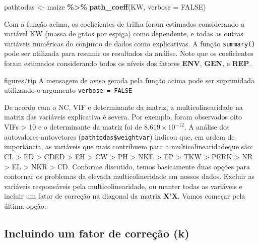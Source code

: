 \documentclass[
]{book}
\newenvironment{Shaded}{\begin{snugshade}}{\end{snugshade}}
\newcommand{\DataTypeTok}[1]{\textcolor[rgb]{0.13,0.29,0.53}{#1}}
\newcommand{\KeywordTok}[1]{\textcolor[rgb]{0.13,0.29,0.53}{\textbf{#1}}}
\newcommand{\NormalTok}[1]{#1}
\newcommand{\OperatorTok}[1]{\textcolor[rgb]{0.81,0.36,0.00}{\textbf{#1}}}
\newcommand{\OtherTok}[1]{\textcolor[rgb]{0.56,0.35,0.01}{#1}}
\newcommand{\StringTok}[1]{\textcolor[rgb]{0.31,0.60,0.02}{#1}}
\numberwithin{equation}{section}
\newcommand{\indt}[1]{\index{#1|ST}}
\newenvironment{dica}
  {\begin{customBlockImage}[colframe=customBlue, title=Dica]{figures/tip}}
  {\end{customBlockImage}}
\begin{document}
\begin{Shaded}
\begin{Highlighting}[]
\NormalTok{pathtodas \textless{}{-}}\StringTok{ }
\StringTok{  }\NormalTok{maize }\OperatorTok{\%\textgreater{}\%}
\StringTok{  }\KeywordTok{path\_coeff}\NormalTok{(KW, }\DataTypeTok{verbose =} \OtherTok{FALSE}\NormalTok{)}
\end{Highlighting}
\end{Shaded}

Com a função acima, os coeficientes de trilha foram estimados considerando a variável KW (massa de grãos por espiga) como dependente, e todas as outras variáveis numéricas do conjunto de dados como explicativas. A função \texttt{summary()} pode ser utilizada para resumir os resultados da análise. Note que os coeficientes foram estimados considerando todos os níveis dos fatores \textbf{ENV}, \textbf{GEN}, e \textbf{REP}.

\begin{dica}
A mensagem de aviso gerada pela função acima pode ser suprimidada utilizando o argumento \texttt{verbose\ =\ FALSE}
\end{dica}

De acordo com o NC, VIF e determinante da matriz, a multicolinearidade \indt{multicolinearidade} na matriz das variáveis explicativa é severa. Por exemplo, foram observados oito VIFs \textgreater{} 10 e o determinante da matriz foi de \(8.619 \times 10^{-12}\). A análise dos autovalores-autovetores (\texttt{pathtodas\$weightvar}) indicou que, em ordem de importância, as variáveis que mais contribuem para a multicolinearidadeque são: CL \textgreater{} ED \textgreater{} CDED \textgreater{} EH \textgreater{} CW \textgreater{} PH \textgreater{} NKE \textgreater{} EP \textgreater{} TKW \textgreater{} PERK \textgreater{} NR \textgreater{} EL \textgreater{} NKR \textgreater{} CD. Conforme discutido, temos basicamente duas opções para contornar os problemas da elevada multicolineridade em nossos dados. Excluir as variáveis responsáveis pela multicolinearidade, ou manter todas as variáveis e incluir um fator de correção na diagonal da matrix \textbf{X'X}. Vamos começar pela última opção.

\hypertarget{incluindo-um-fator-de-correuxe7uxe3o-k}{%
\subsection{Incluindo um fator de correção (k)}\label{incluindo-um-fator-de-correuxe7uxe3o-k}}
\end{document}
